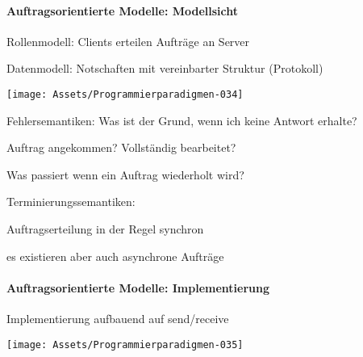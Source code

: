 \documentclass[10pt]{article}
\begin{document}
\paragraph{Auftragsorientierte Modelle: Modellsicht}
\begin{itemize*}
  \item Rollenmodell: Clients erteilen Aufträge an Server
  \item Datenmodell: Notschaften mit vereinbarter Struktur (Protokoll)
\end{itemize*}
\begin{center}
  \centering
  \texttt{[image: Assets/Programmierparadigmen-034]}
\end{center}
\begin{itemize*}
  \item Fehlersemantiken: Was ist der Grund, wenn ich keine Antwort erhalte?
  \begin{itemize*}
    \item Auftrag angekommen? Vollständig bearbeitet?
    \item Was passiert wenn ein Auftrag wiederholt wird?
  \end{itemize*}
  \item Terminierungssemantiken:
  \begin{itemize*}
    \item Auftragserteilung in der Regel synchron
    \item es existieren aber auch asynchrone Aufträge
  \end{itemize*}
\end{itemize*}

\paragraph{Auftragsorientierte Modelle: Implementierung}
\begin{itemize*}
  \item Implementierung aufbauend auf send/receive
\end{itemize*}
\begin{center}
  \centering
  \texttt{[image: Assets/Programmierparadigmen-035]}
\end{center} \ \linebreak
\end{document}
